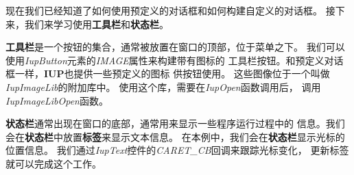 \documentclass{ctexart}
\begin{document}
现在我们已经知道了如何使用预定义的对话框和如何构建自定义的对话框。
接下来，我们来学习使用\textbf{工具栏}和\textbf{状态栏}。

\textbf{工具栏}是一个按钮的集合，通常被放置在窗口的顶部，位于菜单之下。
我们可以使用\emph{IupButton}元素的\emph{IMAGE}属性来构建带有图标的
工具栏按钮。和预定义对话框一样，\textbf{IUP}也提供一些预定义的图标
供按钮使用。
这些图像位于一个叫做\emph{IupImageLib}的附加库中。
使用这个库，需要在\emph{IupOpen}函数调用后，
调用\emph{IupImageLibOpen}函数。

\textbf{状态栏}通常出现在窗口的底部，通常用来显示一些程序运行过程中的
信息。我们会在\textbf{状态栏}中放置\textbf{标签}来显示文本信息。
在本例中，我们会在\textbf{状态栏}显示光标的位置信息。
我们通过\emph{IupText}控件的\emph{CARET\_CB}回调来跟踪光标变化，
更新标签就可以完成这个工作。
\end{document}
